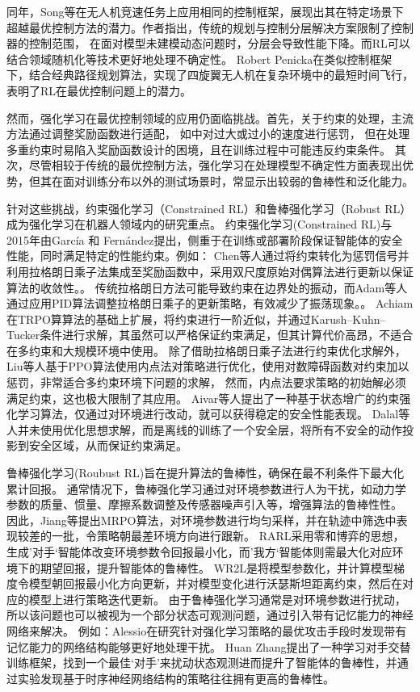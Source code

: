 同年，Song等在无人机竞速任务上应用相同的控制框架，展现出其在特定场景下超越最优控制方法的潜力。作者指出，传统的规划与控制分层解决方案限制了控制器的控制范围，
在面对模型未建模动态问题时，分层会导致性能下降\cite{Song_2023}。而RL可以结合领域随机化等技术更好地处理不确定性。
Robert Penicka在类似控制框架下，结合经典路径规划算法，实现了四旋翼无人机在复杂环境中的最短时间飞行，表明了RL在最优控制问题上的潜力\cite{penicka2022learning}。

然而，强化学习在最优控制领域的应用仍面临挑战。首先，关于约束的处理，主流方法通过调整奖励函数进行适配，
如\parencite{penicka2022learning}中对过大或过小的速度进行惩罚，
但在处理多重约束时易陷入奖励函数设计的困境，且在训练过程中可能违反约束条件。
其次，尽管相较于传统的最优控制方法，强化学习在处理模型不确定性方面表现出优势，但其在面对训练分布以外的测试场景时，常显示出较弱的鲁棒性和泛化能力。

针对这些挑战，约束强化学习（Constrained RL）和鲁棒强化学习（Robust RL）成为强化学习在机器人领域内的研究重点。
约束强化学习(Constrained RL)与2015年由García 和 Fernández提出，侧重于在训练或部署阶段保证智能体的安全性能，同时满足特定的性能约束。例如：
Chen等人通过将约束转化为惩罚信号并利用拉格朗日乘子法集成至奖励函数中，采用双尺度原始对偶算法进行更新以保证算法的收敛性。\cite{tessler2018reward}。
传统拉格朗日方法可能导致约束在边界处的振动，而Adam等人通过应用PID算法调整拉格朗日乘子的更新策略，有效减少了振荡现象。\cite{stooke2020responsive}。
Achiam在TRPO算算法的基础上扩展，将约束进行一阶近似，并通过Karush–Kuhn–Tucker条件进行求解，其虽然可以严格保证约束满足，但其计算代价高昂，不适合在多约束和大规模环境中使用\cite{achiam2017constrained}。
除了借助拉格朗日乘子法进行约束优化求解外，Liu等人基于PPO算法使用内点法对策略进行优化，使用对数障碍函数对约束加以惩罚，非常适合多约束环境下问题的求解，
然而，内点法要求策略的初始解必须满足约束，这也极大限制了其应用\cite{liu2020ipo}。
Aivar等人提出了一种基于状态增广的约束强化学习算法，仅通过对环境进行改动，就可以获得稳定的安全性能表现\cite{sootla2022saute}。
Dalal等人并未使用优化思想求解，而是离线的训练了一个安全层，将所有不安全的动作投影到安全区域，从而保证约束满足\cite{dalal2018safe}。

鲁棒强化学习(Roubust RL)旨在提升算法的鲁棒性，确保在最不利条件下最大化累计回报。
通常情况下，鲁棒强化学习通过对环境参数进行人为干扰，如动力学参数的质量、惯量、摩擦系数调整及传感器噪声引入等，增强算法的鲁棒性性。
因此，Jiang等提出MRPO算法，对环境参数进行均匀采样，并在轨迹中筛选中表现较差的一批，令策略朝最差环境方向进行跟新\cite{jiang2021monotonic}。
RARL采用零和博弈的思想，生成’对手‘智能体改变环境参数令回报最小化，而’我方‘智能体则需最大化对应环境下的期望回报，提升智能体的鲁棒性\cite{pinto2017robust}。
WR2L是将模型参数化，并计算模型梯度令模型朝回报最小化方向更新，并对模型变化进行沃瑟斯坦距离约束，然后在对应的模型上进行策略迭代更新。\cite{abdullah2019wasserstein}
由于鲁棒强化学习通常是对环境参数进行扰动，所以该问题也可以被视为一个部分状态可观测问题，通过引入带有记忆能力的神经网络来解决\cite{ni2021recurrent}。
例如：Alessio在研究针对强化学习策略的最优攻击手段时发现带有记忆能力的网络结构能够更好地处理干扰\cite{russo2011dynamics}。
Huan Zhang提出了一种学习对手交替训练框架，找到一个最佳‘对手’来扰动状态观测进而提升了智能体的鲁棒性，并通过实验发现基于时序神经网络结构的策略往往拥有更高的鲁棒性\cite{zhang2021robust}。

